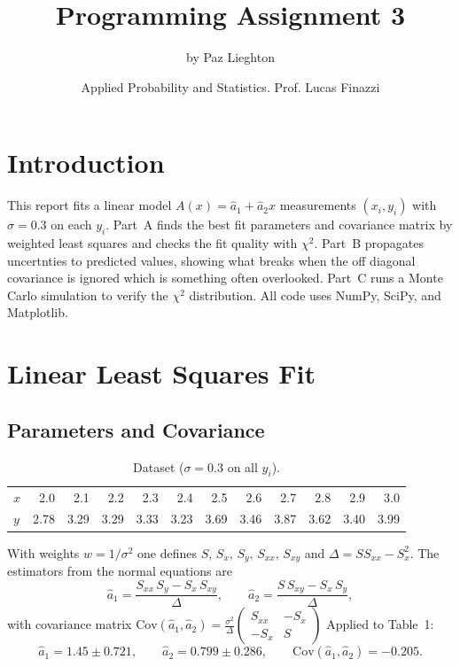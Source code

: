 \documentclass[11pt, letterpaper]{article}
\title{Programming Assignment 3}
\author{by Paz Lieghton}
\date{\small Applied Probability and Statistics. Prof. Lucas Finazzi}
\begin{document}
	\maketitle
	
	\section*{Introduction}
	This report fits a linear model $A(x) = \hat{a}_1 + \hat{a}_2 x$ measurements $(x_i, y_i)$ with $\sigma = 0.3$ on each $y_i$. Part~A finds the best fit parameters and covariance matrix by weighted least squares and checks the fit quality with $\chi^2$. Part~B propagates uncertnties to predicted values, showing what breaks when the off diagonal covariance is ignored which is something often overlooked. Part~C runs a Monte Carlo simulation to verify the $\chi^2$ distribution. All code uses NumPy, SciPy, and Matplotlib.
	
	\section{Linear Least Squares Fit}
	
	\subsection{Parameters and Covariance}
		\begin{table}[H]
		\centering
	
		\begin{tabular}{lrrrrrrrrrrr}
			\toprule
			$x$ & 2.0 & 2.1 & 2.2 & 2.3 & 2.4 & 2.5 & 2.6 & 2.7 & 2.8 & 2.9 & 3.0 \\
			$y$ & 2.78 & 3.29 & 3.29 & 3.33 & 3.23 & 3.69 & 3.46 & 3.87 & 3.62 & 3.40 & 3.99 \\
			\bottomrule
			
		\end{tabular}
		\caption{Dataset ($\sigma = 0.3$ on all $y_i$).}
	\end{table}
	With weights $w = 1/\sigma^2$ one defines $S,\,S_x,\,S_y,\,S_{xx},\,S_{xy}$ and $\Delta = S S_{xx} - S_x^2$. The estimators from the normal equations are
	\[
	\hat{a}_1 = \frac{S_{xx}\,S_y - S_x\,S_{xy}}{\Delta}, \qquad
	\hat{a}_2 = \frac{S\,S_{xy} - S_x\,S_y}{\Delta},
	\]
	with covariance matrix $\mathrm{Cov}(\hat{a}_1,\hat{a}_2) = \tfrac{\sigma^2}{\Delta}\!\begin{pmatrix}S_{xx}&-S_x\\-S_x&S\end{pmatrix}$        Applied to Table~1:
	\[
	\hat{a}_1 = 1.45 \pm 0.721, \qquad \hat{a}_2 = 0.799 \pm 0.286, \qquad
	\mathrm{Cov}(\hat{a}_1,\hat{a}_2) = -0.205.
	\]
	
\end{document}
